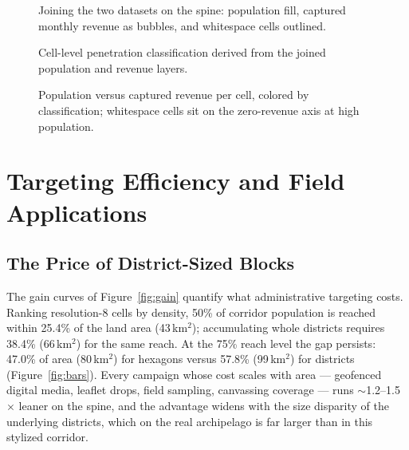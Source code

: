 \documentclass[11pt,a4paper,twocolumn]{article}
\begin{document}
\begin{figure}[!tp]
  \centering
  \resizebox{0.86\textwidth}{!}{}
  \caption{Joining the two datasets on the spine: population fill, captured
    monthly revenue as bubbles, and whitespace cells outlined.}
  \label{fig:overlay}
\end{figure}

\begin{figure}[!tp]
  \centering
  \resizebox{0.86\textwidth}{!}{}
  \caption{Cell-level penetration classification derived from the joined
    population and revenue layers.}
  \label{fig:classification}
\end{figure}

\begin{figure}[!tp]
  \centering
  \resizebox{\columnwidth}{!}{}
  \caption{Population versus captured revenue per cell, colored by
    classification; whitespace cells sit on the zero-revenue axis at high
    population.}
  \label{fig:scatter}
\end{figure}

\section{Targeting Efficiency and Field Applications}
\label{sec:applications}

\subsection{The Price of District-Sized Blocks}

The gain curves of Figure~\ref{fig:gain} quantify what administrative
targeting costs. Ranking resolution-8 cells by density, 50\% of corridor
population is reached within 25.4\% of the land area (43\,km$^2$);
accumulating whole districts requires 38.4\% (66\,km$^2$) for the same
reach. At the 75\% reach level the gap persists: 47.0\% of area
(80\,km$^2$) for hexagons versus 57.8\% (99\,km$^2$) for districts
(Figure~\ref{fig:bars}). Every campaign whose cost scales with area ---
geofenced digital media, leaflet drops, field sampling, canvassing
coverage --- runs ${\sim}$1.2--1.5$\times$ leaner on the spine, and the
advantage widens with the size disparity of the underlying districts,
which on the real archipelago is far larger than in this stylized
corridor.
\end{document}
